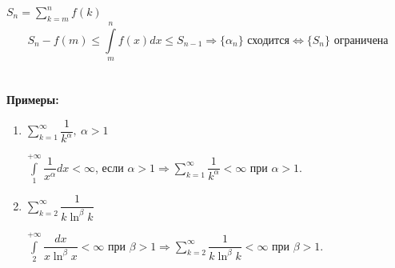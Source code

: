 \documentclass[a4paper,12pt]{article} %
\newcommand{\series}{\sum\limits_{k=1}^{\infty}}
\begin{document}
$S_n = \sum\limits_{k=m}^{n} f(k)$
\[S_n - f(m) \leqslant \int\limits_{m}^{n} f(x)dx \leqslant S_{n-1} \Rightarrow \{ \alpha_n \} \text{ сходится} \Leftrightarrow \{ S_n \} \text{ ограничена} \]\\\\
\textbf{Примеры:}
\begin{enumerate}
	\item $\series \dfrac{1}{k^{\alpha}}, \ \alpha > 1$
	
	$\int\limits_{1}^{+\infty} \dfrac{1}{x^{\alpha}}dx < \infty$, если $\alpha > 1 \Rightarrow \series \dfrac{1}{k^{\alpha}} < \infty$ при $\alpha > 1$. 
	\item $\sum\limits_{k=2}^{\infty} \dfrac{1}{k \ln^{\beta}k}$
	
	$\int\limits_{2}^{+\infty} \dfrac{dx}{x \ln^{\beta}x} < \infty \text{ при } \beta > 1 \Rightarrow \sum\limits_{k=2}^{\infty}\dfrac{1}{k \ln^{\beta}k} < \infty \text{ при } \beta > 1$. \\
\end{enumerate}
\end{document}
